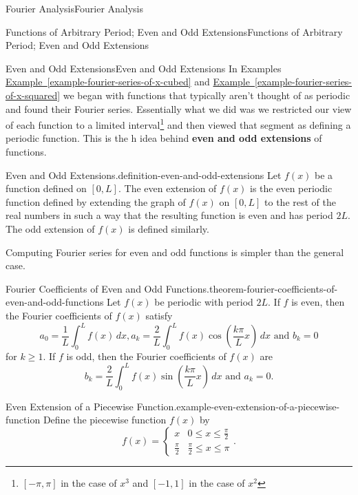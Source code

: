 \documentclass[10pt,]{book}
\newcommand{\terminology}[1]{\textbf{#1}}
\numberwithin{equation}{section}
\begin{document}
\begin{chapterptx}{Fourier Analysis}{}{Fourier Analysis}{}{}
\begin{sectionptx}{Functions of Arbitrary Period; Even and Odd Extensions}{}{Functions of Arbitrary Period; Even and Odd Extensions}{}{}
\begin{subsectionptx}{Even and Odd Extensions}{}{Even and Odd Extensions}{}{}
In Examples \hyperref[example-fourier-series-of-x-cubed]{Example~\ref{example-fourier-series-of-x-cubed}} and \hyperref[example-fourier-series-of-x-squared]{Example~\ref{example-fourier-series-of-x-squared}} we began with functions that typically aren't thought of as periodic and found their Fourier series. Essentially what we did was we restricted our view of each function to a limited interval\footnote{\([-\pi,\pi]\) in the case of \(x^{3}\) and \([-1,1]\) in the case of \(x^{2}\)\label{footnote-periodic-extensions}} and then viewed that segment as defining a periodic function. This is the h idea behind \terminology{even and odd extensions} of functions.%
\begin{definition}{Even and Odd Extensions.}{definition-even-and-odd-extensions}%
\hypertarget{p-403}{}%
Let \(f(x)\) be a function defined on \([0,L]\). The even extension of \(f(x)\) is the even periodic function defined by extending the graph of \(f(x)\) on \([0,L]\) to the rest of the real numbers in such a way that the resulting function is even and has period \(2L\). The odd extension of \(f(x)\) is defined similarly.%
\end{definition}
\hypertarget{p-404}{}%
Computing Fourier series for even and odd functions is simpler than the general case.%
\begin{theorem}{Fourier Coefficients of Even and Odd Functions.}{}{theorem-fourier-coefficients-of-even-and-odd-functions}%
\hypertarget{p-405}{}%
Let \(f(x)\) be periodic with period \(2L\). If \(f\) is even, then the Fourier coefficients of \(f(x)\) satisfy%
\begin{equation*}
a_{0} = \frac{1}{L}\int_{0}^{L}f(x)\,dx, a_{k} = \frac{2}{L}\int_{0}^{L}f(x)\cos\left(\frac{k\pi}{L}x\right)\,dx\text{ and } b_{k} = 0
\end{equation*}
for \(k\geq1\). If \(f\) is odd, then the Fourier coefficients of \(f(x)\) are%
\begin{equation*}
b_{k} = \frac{2}{L}\int_{0}^{L}f(x)\sin\left(\frac{k\pi}{L}x\right)\,dx\text{ and } a_{k} = 0.
\end{equation*}
%
\end{theorem}
\begin{example}{Even Extension of a Piecewise Function.}{example-even-extension-of-a-piecewise-function}%
\hypertarget{p-406}{}%
Define the piecewise function \(f(x)\) by%
\begin{equation*}
f(x) = \begin{cases}x & 0\leq x\leq \frac{\pi}{2} \\ \frac{\pi}{2} & \frac{\pi}{2}\leq x\leq \pi\end{cases}.

\end{equation*}
\end{example}
\end{subsectionptx}
\end{sectionptx}
\end{chapterptx}
\end{document}
